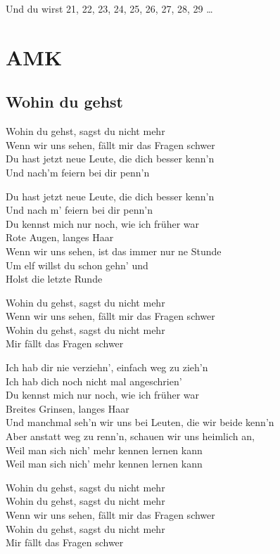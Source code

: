 \documentclass[]{book}
\begin{document}
Und du wirst 21, 22, 23, 24, 25, 26, 27, 28, 29 \ldots{}

\hypertarget{amk}{%
\chapter{AMK}\label{amk}}

\hypertarget{wohin-du-gehst-3}{%
\section{Wohin du gehst}\label{wohin-du-gehst-3}}

Wohin du gehst, sagst du nicht mehr\\
Wenn wir uns sehen, fällt mir das Fragen schwer\\
Du hast jetzt neue Leute, die dich besser kenn'n\\
Und nach'm feiern bei dir penn'n

Du hast jetzt neue Leute, die dich besser kenn'n\\
Und nach m' feiern bei dir penn'n\\
Du kennst mich nur noch, wie ich früher war\\
Rote Augen, langes Haar\\
Wenn wir uns sehen, ist das immer nur ne Stunde\\
Um elf willst du schon gehn' und\\
Holst die letzte Runde

Wohin du gehst, sagst du nicht mehr\\
Wenn wir uns sehen, fällt mir das Fragen schwer\\
Wohin du gehst, sagst du nicht mehr\\
Mir fällt das Fragen schwer

Ich hab dir nie verziehn', einfach weg zu zieh'n\\
Ich hab dich noch nicht mal angeschrien'\\
Du kennst mich nur noch, wie ich früher war\\
Breites Grinsen, langes Haar\\
Und manchmal seh'n wir uns bei Leuten, die wir beide kenn'n\\
Aber anstatt weg zu renn'n, schauen wir uns heimlich an,\\
Weil man sich nich' mehr kennen lernen kann\\
Weil man sich nich' mehr kennen lernen kann

Wohin du gehst, sagst du nicht mehr\\
Wohin du gehst, sagst du nicht mehr\\
Wenn wir uns sehen, fällt mir das Fragen schwer\\
Wohin du gehst, sagst du nicht mehr\\
Mir fällt das Fragen schwer
\end{document}
